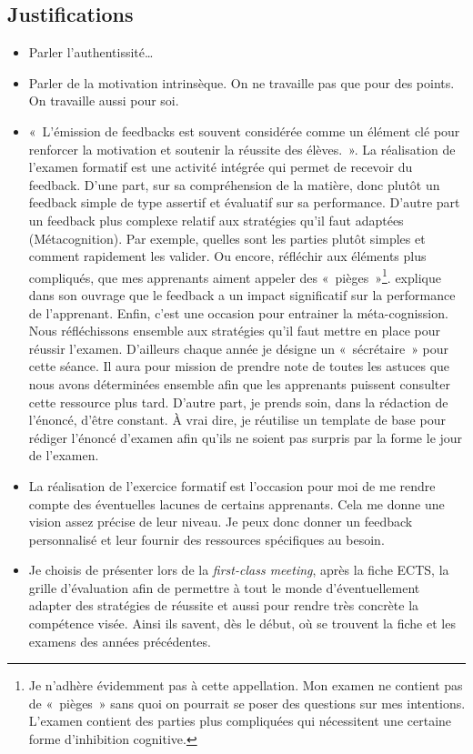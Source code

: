 \subsection{Justifications}
\label{evaluation_des_apprentissages_justifications}
\begin{itemize}
    \item Parler l'authentissité…
    \item Parler de la motivation intrinsèque. On ne travaille pas que pour des points. On travaille aussi pour soi.
    \item «~L’émission de feedbacks est souvent considérée comme un élément clé pour renforcer la motivation et soutenir la réussite des élèves.~»\cite{georges2011feedbacks}. La réalisation de l'examen formatif est une activité intégrée qui permet de recevoir du feedback. D'une part, sur sa compréhension de la matière, donc plutôt un feedback simple de type assertif et évaluatif\cite{georges2011feedbacks} sur sa performance. D'autre part un feedback plus complexe relatif aux stratégies qu'il faut adaptées (Métacognition). Par exemple, quelles sont les parties plutôt simples et comment rapidement les valider. Ou encore, réfléchir aux éléments plus compliqués, que mes apprenants aiment appeler des «~pièges~»\footnote{Je n'adhère évidemment pas à cette appellation. Mon examen ne contient pas de «~pièges~» sans quoi on pourrait se poser des questions sur mes intentions. L'examen contient des parties plus compliquées qui nécessitent une certaine forme d'inhibition cognitive.}. \citet{hattie2008visible} explique dans son ouvrage que le feedback a un impact significatif sur la performance de l'apprenant. Enfin, c'est une occasion pour entrainer la méta-cognission\cite{leclercq2008modele}. Nous réfléchissons ensemble aux stratégies qu'il faut mettre en place pour réussir l'examen. D'ailleurs chaque année je désigne un «~sécrétaire~» pour cette séance. Il aura pour mission de prendre note de toutes les astuces que nous avons déterminées ensemble afin que les apprenants puissent consulter cette ressource plus tard. D'autre part, je prends soin, dans la rédaction de l'énoncé, d'être constant. À vrai dire, je réutilise un template de base pour rédiger l'énoncé d’examen afin qu’ils ne soient pas surpris par la forme le jour de l'examen.
    \item La réalisation de l'exercice formatif est l'occasion pour moi de me rendre compte des éventuelles lacunes de certains apprenants. Cela me donne une vision assez précise de leur niveau. Je peux donc donner un feedback personnalisé et leur fournir des ressources spécifiques au besoin.
    \item Je choisis de présenter lors de la \textit{first-class meeting}, après la fiche ECTS, la grille d'évaluation afin de permettre à tout le monde d'éventuellement adapter des stratégies de réussite et aussi pour rendre très concrète la compétence visée. Ainsi ils savent, dès le début, où se trouvent la fiche et les examens des années précédentes.
\end{itemize}

